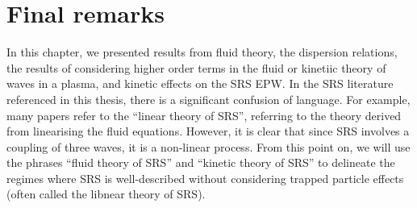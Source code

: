 \section{Final remarks}
In this chapter, we presented results from fluid theory, the dispersion relations, the results of considering higher order terms in the fluid or kinetiic theory of waves in a plasma, and kinetic effects on the SRS EPW. In the SRS literature referenced in this thesis, there is a significant confusion of language. For example, many papers refer to the ``linear theory of SRS'', referring to the theory derived from linearising the fluid equations. However, it is clear that since SRS involves a coupling of three waves, it is a non-linear process. From this point on, we will use the phrases ``fluid theory of SRS'' and ``kinetic theory of SRS'' to delineate the regimes where SRS is well-described without considering trapped particle effects (often called the libnear theory of SRS).

%
%
